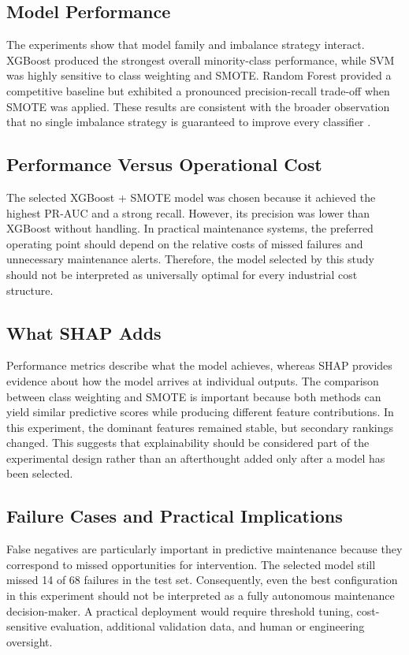 \documentclass[conference]{IEEEtran}
\begin{document}
\subsection{Model Performance}

The experiments show that model family and imbalance strategy interact. XGBoost produced the strongest overall minority-class performance, while SVM was highly sensitive to class weighting and SMOTE. Random Forest provided a competitive baseline but exhibited a pronounced precision-recall trade-off when SMOTE was applied. These results are consistent with the broader observation that no single imbalance strategy is guaranteed to improve every classifier \cite{rismawan2026imbalance}.

\subsection{Performance Versus Operational Cost}

The selected XGBoost + SMOTE model was chosen because it achieved the highest PR-AUC and a strong recall. However, its precision was lower than XGBoost without handling. In practical maintenance systems, the preferred operating point should depend on the relative costs of missed failures and unnecessary maintenance alerts. Therefore, the model selected by this study should not be interpreted as universally optimal for every industrial cost structure.

\subsection{What SHAP Adds}

Performance metrics describe what the model achieves, whereas SHAP provides evidence about how the model arrives at individual outputs. The comparison between class weighting and SMOTE is important because both methods can yield similar predictive scores while producing different feature contributions. In this experiment, the dominant features remained stable, but secondary rankings changed. This suggests that explainability should be considered part of the experimental design rather than an afterthought added only after a model has been selected.

\subsection{Failure Cases and Practical Implications}

False negatives are particularly important in predictive maintenance because they correspond to missed opportunities for intervention. The selected model still missed 14 of 68 failures in the test set. Consequently, even the best configuration in this experiment should not be interpreted as a fully autonomous maintenance decision-maker. A practical deployment would require threshold tuning, cost-sensitive evaluation, additional validation data, and human or engineering oversight.
\end{document}
